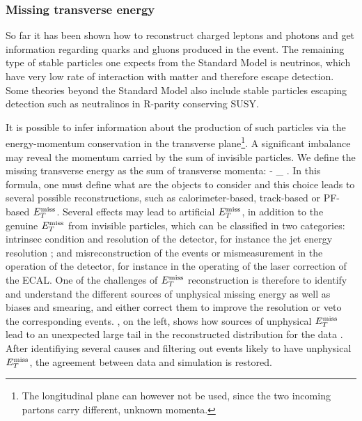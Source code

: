             \subsubsection{Missing transverse energy}

        So far it has been shown how to reconstruct charged leptons and photons and get
        information regarding quarks and gluons produced in the event. The remaining
        type of stable particles one expects from the Standard Model is neutrinos, which
        have very low rate of interaction with matter and therefore escape detection. Some
        theories beyond the Standard Model also include stable particles escaping detection
        such as neutralinos in R-parity conserving SUSY.

        It is possible to infer information about the production
        of such particles via the energy-momentum conservation in the transverse plane\footnote{The
        longitudinal plane can however not be used, since the two incoming partons carry
        different, unknown momenta.}. A significant imbalance may reveal the momentum carried by
        the sum of invisible particles. We define the missing transverse energy as the
        sum of transverse momenta:
        {
            \vec{\MET}  - \sum_{} \vec{\pT}.
        }
        In this formula, one must define what are the objects to consider and this choice
        leads to several possible reconstructions, such as calorimeter-based, track-based
        or PF-based $E_T^\text{miss}$. Several effects may lead to artificial $E_T^\text{miss}$, in addition to the
        genuine $E_T^\text{miss}$ from invisible particles, which can be classified in two categories:
        intrinsec condition and resolution of the detector, for instance the jet energy
        resolution ; and misreconstruction of the events or mismeasurement in the
        operation of the detector, for instance in the operating of the laser correction
        of the ECAL. One of the challenges of $E_T^\text{miss}$ reconstruction is therefore to identify
        and understand the different sources of unphysical missing energy as well as biases and
        smearing, and either correct them to improve the resolution or veto the corresponding
        events.
        , on the left, shows how sources of unphysical $E_T^\text{miss}$
        lead to an unexpected large tail in the reconstructed distribution for the data \cite{METperf}.
        After identifiying several causes and filtering out events likely to have unphysical
        $E_T^\text{miss}$, the agreement between data and simulation is restored.

